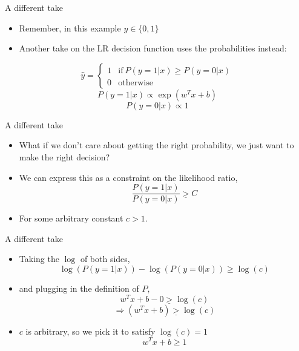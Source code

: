 \documentclass[12pt,notes,mathserif]{beamer}
\providecommand{\tightlist}{%
	\setlength{\itemsep}{0pt}\setlength{\parskip}{0pt}}
\begin{document}
\begin{frame}{A different take}

\begin{itemize}
\item
  Remember, in this example \(y\in\{0,1\}\)
\item
  Another take on the LR decision function uses the probabilities
  instead:
\end{itemize}

\[\hat{y}=\left\{\begin{array}{ll}
1 & \text{if}\ P(y=1|x)\geq P(y=0|x)\\
0 & \text{otherwise}
\end{array}\right.\] \[
P(y=1|x)\propto\exp(w^{T}x+b)
\] \[
P(y=0|x)\propto 1
\]

\end{frame}

\begin{frame}{A different take}

\begin{itemize}
\item
  What if we don't care about getting the right probability, we just
  want to make the right decision?
\item
  We can express this as a constraint on the likelihood ratio, \[
  \frac{P(y=1|x)}{P(y=0|x)}\underline{>}C
  \]
\item
  For some arbitrary constant \(c>1.\)
\end{itemize}

\end{frame}

\begin{frame}{A different take}

\begin{itemize}
\tightlist
\item
  Taking the \(\log\) of both sides, \[
  \log(P(y=1|x))-\log(P(y=0|x))\geq\log(c)
  \]
\item
  and plugging in the definition of \(P,\) \[
  w^{T}x+b-0\underline{>}\log(c)
  \] \[
  \Rightarrow(w^{T}x+b)\underline{>}\log(c)
  \]
\item
  \(c\) is arbitrary, so we pick it to satisfy \(\log(c)=1\) \[
  w^{T}x+b\geq 1
  \]
\end{itemize}

\end{frame}
\end{document}
